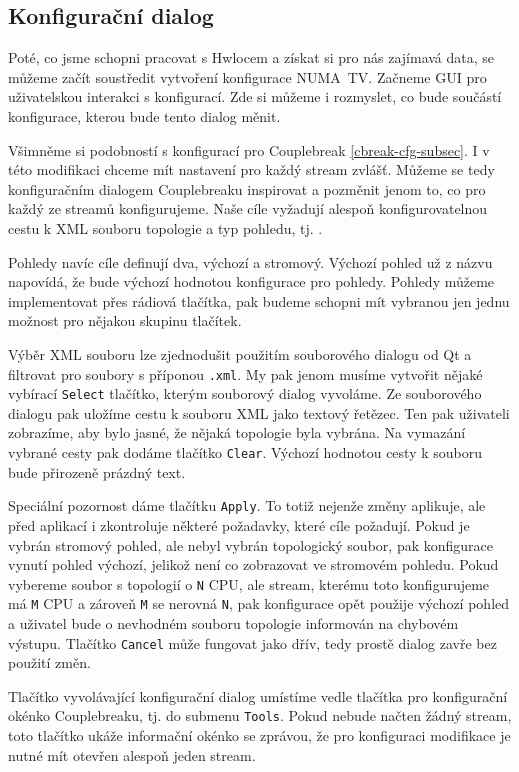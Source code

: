 \subsection{Konfigurační dialog}
\label{numatv-cfg-subsec}

Poté, co jsme schopni pracovat s Hwlocem a získat si pro nás zajímavá data, se můžeme začít soustředit vytvoření konfigurace NUMA~TV. Začneme GUI pro uživatelskou interakci s konfigurací. Zde si můžeme i rozmyslet, co bude součástí konfigurace, kterou bude tento dialog měnit.

Všimněme si podobností s konfigurací pro Couplebreak \ref{cbreak-cfg-subsec}. I v této modifikaci chceme mít nastavení pro každý stream zvlášť. Můžeme se tedy konfiguračním dialogem Couplebreaku inspirovat a pozměnit jenom to, co pro každý ze streamů konfigurujeme. Naše cíle vyžadují alespoň konfigurovatelnou cestu k XML souboru topologie a typ pohledu, tj. .

Pohledy navíc cíle definují dva, výchozí a stromový. Výchozí pohled už z názvu napovídá, že bude výchozí hodnotou konfigurace pro pohledy. Pohledy můžeme implementovat přes rádiová tlačítka, pak budeme schopni mít vybranou jen jednu možnost pro nějakou skupinu tlačítek.

Výběr XML souboru lze zjednodušit použitím souborového dialogu od Qt a filtrovat pro soubory s příponou \texttt{.xml}. My pak jenom musíme vytvořit nějaké vybírací \texttt{Select} tlačítko, kterým souborový dialog vyvoláme. Ze souborového dialogu pak uložíme cestu k souboru XML jako textový řetězec. Ten pak uživateli zobrazíme, aby bylo jasné, že nějaká topologie byla vybrána. Na vymazání vybrané cesty pak dodáme tlačítko \texttt{Clear}. Výchozí hodnotou cesty k souboru bude přirozeně prázdný text. 

Speciální pozornost dáme tlačítku \texttt{Apply}. To totiž nejenže změny aplikuje, ale před aplikací i zkontroluje některé požadavky, které cíle požadují. Pokud je vybrán stromový pohled, ale nebyl vybrán topologický soubor, pak konfigurace vynutí pohled výchozí, jelikož není co zobrazovat ve stromovém pohledu. Pokud vybereme soubor s topologií o \texttt{N} CPU, ale stream, kterému toto konfigurujeme má \texttt{M} CPU a zároveň \texttt{M} se nerovná \texttt{N}, pak konfigurace opět použije výchozí pohled a uživatel bude o nevhodném souboru topologie informován na chybovém výstupu. Tlačítko \texttt{Cancel} může fungovat jako dřív, tedy prostě dialog zavře bez použití změn.

Tlačítko vyvolávající konfigurační dialog umístíme vedle tlačítka pro konfigurační okénko Couplebreaku, tj. do submenu \texttt{Tools}. Pokud nebude načten žádný stream, toto tlačítko ukáže informační okénko se zprávou, že pro konfiguraci modifikace je nutné mít otevřen alespoň jeden stream.

